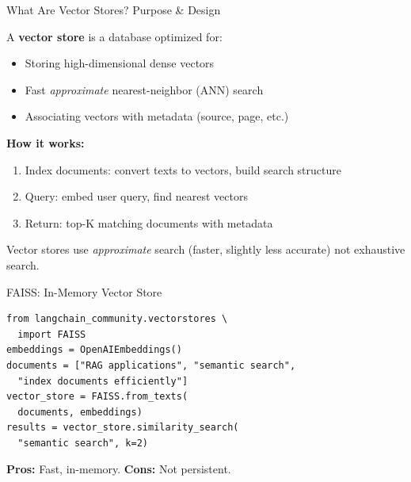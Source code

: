 \documentclass[aspectratio=169,11pt]{beamer}
\begin{document}
\begin{frame}{What Are Vector Stores? Purpose \& Design}
  \begin{conceptbox}[Definition]
    A \textbf{vector store} is a database optimized for:
    \begin{itemize}
    \setlength{\itemsep}{1pt}
      \item Storing high-dimensional dense vectors
      \item Fast \emph{approximate} nearest-neighbor (ANN) search
      \item Associating vectors with metadata (source, page, etc.)
    \end{itemize}
  \end{conceptbox}

  \vspace{0.05cm}
  \textbf{How it works:}
  \begin{enumerate}
    \setlength{\itemsep}{0pt}
    \item Index documents: convert texts to vectors, build search structure
    \item Query: embed user query, find nearest vectors
    \item Return: top-K matching documents with metadata
  \end{enumerate}

  \vspace{0.05cm}
  \begin{warningbox}
    Vector stores use \emph{approximate} search (faster, slightly less accurate) not exhaustive search.
  \end{warningbox}
\end{frame}

\begin{frame}[fragile]{FAISS: In-Memory Vector Store}
  \begin{lstlisting}[basicstyle=\ttfamily\tiny]
from langchain_community.vectorstores \
  import FAISS
embeddings = OpenAIEmbeddings()
documents = ["RAG applications", "semantic search",
  "index documents efficiently"]
vector_store = FAISS.from_texts(
  documents, embeddings)
results = vector_store.similarity_search(
  "semantic search", k=2)
  \end{lstlisting}

  \textbf{Pros:} Fast, in-memory. \textbf{Cons:} Not persistent.
\end{frame}
\end{document}
